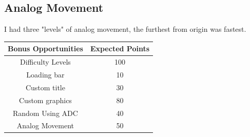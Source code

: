 \documentclass{article}
\begin{document}
\subsection{Analog Movement}
\begin{center}
    I had three "levels" of analog movement, the furthest from origin was fastest.
\end{center}
\begin{center}
    \begin{tabular}{c|c}
         Bonus Opportunities &  Expected Points\\
         \hline
         Difficulty Levels & 100\\
         Loading bar & 10\\
         Custom title & 30\\
         Custom graphics & 80\\
         Random Using ADC & 40\\
         Analog Movement & 50\\
    \end{tabular}
\end{center}
\end{document}
